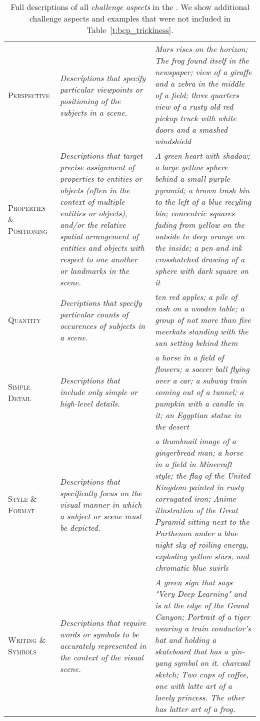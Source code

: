 \begin{table*}
\begin{adjustbox}{center}
\begin{tabular}{p{1.8cm}p{5.2cm}p{9.5cm}}
\textsc{Perspective} & \textit{Descriptions that specify particular viewpoints or positioning of the subjects in a scene.} & \textit{Mars rises on the horizon; The frog found itself in the newspaper; view of a giraffe and a zebra in the middle of a field; three quarters view of a rusty old red pickup truck with white doors and a smashed windshield} \\
\textsc{Properties \& Positioning} & \textit{Descriptions that target precise assignment of properties to entities or objects (often in the context of multiple entities or objects), and/or the relative spatial arrangement of entities and objects with respect to one another or landmarks in the scene.} & \textit{A green heart with shadow; a large yellow sphere behind a small purple pyramid; a brown trash bin to the left of a blue recyling bin; concentric squares fading from yellow on the outside to deep orange on the inside; a pen-and-ink crosshatched drawing of a sphere with dark square on it} \\
\textsc{Quantity} & \textit{Decriptions that specify particular counts of occurences of subjects in a scene.} & \textit{ten red apples; a pile of cash on a wooden table; a group of not more than five meerkats standing with the sun setting behind them} \\
\textsc{Simple Detail} & \textit{Descriptions that include only simple or high-level details.} & \textit{a horse in a field of flowers; a soccer ball flying over a car; a subway train coming out of a tunnel; a pumpkin with a candle in it; an Egyptian statue in the desert} \\
\textsc{Style \& Format} & \textit{Descriptions that specifically focus on the visual manner in which a subject or scene must be depicted.} & \textit{a thumbnail image of a gingerbread man; a horse in a field in Minecraft style; the flag of the United Kingdom painted in rusty corrugated iron; Anime illustration of the Great Pyramid sitting next to the Parthenon under a blue night sky of roiling energy, exploding yellow stars, and chromatic blue swirls} \\
\textsc{Writing \& Symbols} & \textit{Descriptions that require words or symbols to be accurately represented in the context of the visual scene.} & \textit{A green sign that says "Very Deep Learning" and is at the edge of the Grand Canyon; Portrait of a tiger wearing a train conductor's hat and holding a skateboard that has a yin-yang symbol on it. charcoal sketch; Two cups of coffee, one with latte art of a lovely princess. The other has latter art of a frog.} \\
\bottomrule
\end{tabular}
\end{adjustbox}
\caption{Full descriptions of all {\it challenge aspects} in the \bcpa{}. We show additional challenge aspects and examples that were not included in Table~\ref{t:bcp_trickiness}.}
\label{t:appendix_bcp_trickiness}
\end{table*}
